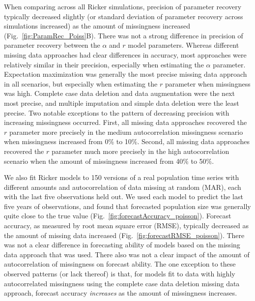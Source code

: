 \documentclass{article}
\begin{document}
When comparing across all Ricker simulations, precision of parameter recovery typically decreased slightly (or standard deviation of parameter recovery across simulations increased) as the amount of missingness increased (Fig.\ \ref{fig:ParamRec_Poiss}B). There was not a strong difference in precision of parameter recovery between the $\alpha$ and $r$ model parameters. Whereas different missing data approaches had clear differences in accuracy, most approaches were relatively similar in their precision, especially when estimating the $\alpha$ parameter. Expectation maximization was generally the most precise missing data approach in all scenarios, but especially when estimating the $r$ parameter when missingness was high. Complete case data deletion and data augmentation were the next most precise, and multiple imputation and simple data deletion were the least precise. Two notable exceptions to the pattern of decreasing precision with increasing missingness occurred. First, all missing data approaches recovered the $r$ parameter more precisely in the medium autocorrelation missingness scenario when missingness increased from 0\%  to 10\%. Second, all missing data approaches recovered the $r$ parameter much more precisely in the high autocorrelation scenario when the amount of missingness increased from 40\% to 50\%. 

We also fit Ricker models to 150 versions of a real population time series with different amounts and autocorrelation of data missing at random (MAR), each with the last five observations held out. We used each model to predict the last five years of observations, and found that forecasted population size  was generally quite close to the true value (Fig.\ \ref{fig:forecastAccuracy_poisson}). Forecast accuracy, as measured by root mean square error (RMSE), typically decreased as the amount of missing data increased (Fig.\ \ref{fig:forecastRMSE_poisson}). There was not a clear difference in forecasting ability of models based on the missing data approach that was used. There also was not a clear impact of the amount of autocorrelation of missingness on forecast ability. The one exception to these observed patterns (or lack thereof) is that, for models fit to data with highly autocorrelated missingness using the complete case data deletion missing data approach, forecast accuracy \textit{increases} as the amount of missingness increases. 
\end{document}
